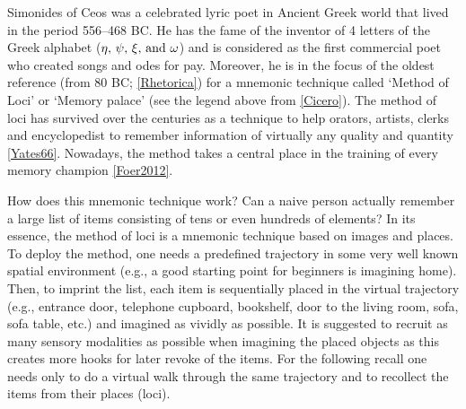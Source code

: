   Simonides of Ceos was a celebrated lyric poet in Ancient Greek world that
  lived in the period 556--468 BC. He has the fame of the inventor of 4 letters
  of the Greek alphabet ($\eta, \, \psi, \, \xi,\,{\rm and } \,\, \omega$) and
  is considered as the first commercial poet who created songs and odes for pay.
  Moreover, he is in the focus of the oldest reference (from 80 BC;
  \ref{Rhetorica}) for a mnemonic technique called `Method of Loci' or `Memory
  palace' (see the legend above from \ref{Cicero}). The method of loci has
  survived over the centuries as a technique to help orators, artists, clerks
  and encyclopedist to remember information of virtually any quality and
  quantity \ref{Yates66}. Nowadays, the method takes a central place in the
  training of every memory champion \ref{Foer2012}.
  
  How does this mnemonic technique work? Can a naive person actually remember a
  large list of items consisting of tens or even hundreds of elements? In its
  essence, the method of loci is a mnemonic technique based on images and
  places. To deploy the method, one needs a predefined trajectory in some very
  well known spatial environment (e.g., a good starting point for beginners is
  imagining home). Then, to imprint the list, each item is sequentially placed
  in the virtual trajectory (e.g., entrance door, telephone cupboard,
  bookshelf, door to the living room, sofa, sofa table, etc.) and imagined as
  vividly as possible. It is suggested to recruit as many sensory modalities as
  possible when imagining the placed objects as this creates more hooks for
  later revoke of the items. For the following recall one needs only to do a
  virtual walk through the same trajectory and to recollect the items from
  their places (loci). 


